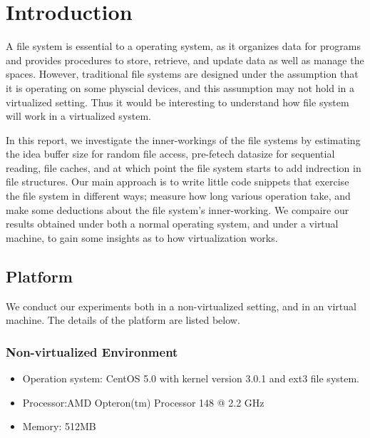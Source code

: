 \section{Introduction}
\label{section:intro}

A file system is essential to a operating system, as it organizes data for programs and provides procedures to store, retrieve, and update data as well as manage the spaces. However, traditional file systems are designed under the assumption that it is operating on some physcial devices, and this assumption may not hold in a virtualized setting. Thus it would be interesting to understand how file system will work in a virtualized system.

In this report, we investigate the inner-workings of the file systems by estimating the idea buffer size for random file access, pre-fetech datasize for sequential reading, file caches, and at which point the file system starts to add indrection in file structures. Our main approach is to write little code snippets that exercise the file system in different ways; measure how long various operation take, and make some deductions about the file system's inner-working. We compaire our results obtained under both a normal operating system, and under a virtual machine, to gain some insights as to how virtualization works.  

\subsection{Platform}
\label{subsection:platform}

We conduct our experiments both in a non-virtualized setting, and in an virtual machine. The details of the platform are listed below.

\subsubsection{Non-virtualized Environment}
\begin{itemize}
\item{}
Operation system: CentOS 5.0 with kernel version 3.0.1 and ext3 file system. 
\item{}
Processor:AMD Opteron(tm) Processor 148 @ 2.2 GHz
\item{}
Memory: 512MB
\end{itemize}

